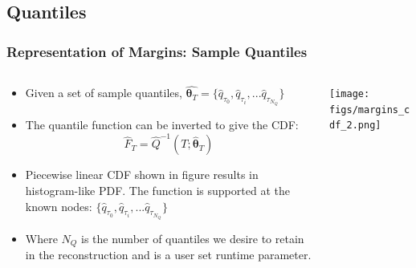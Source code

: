 \documentclass[t, pdftex]{beamer}
\begin{document}
\subsection*{Quantiles}
\begin{frame}
\frametitle{Representation of Margins: Sample Quantiles}
\vspace{-15pt}
    \begin{columns}
        \begin{column}{0.5\textwidth}
            \scriptsize{
                \begin{itemize}
                    \item Given a set of sample quantiles, $\hat{\mathbf{\theta}_T} = \{\hat q_{\tau_0}, \hat q_{\tau_i}, ... \hat{q}_{\tau_{N_Q}} \}$
                    \item The quantile function can be inverted to give the CDF:
                    \[
                    \hat F_T = \hat{Q}^{-1}(T; \mathbf{\hat \theta}_T)
                    \]
                    \item Piecewise linear CDF shown in figure results in histogram-like PDF.  The function is supported at the known nodes: $\{ \hat q_{\tau_0}, \hat q_{\tau_i}, ... \hat q_{\tau_{N_Q}} \}$
                    \item Where $N_{Q}$ is the number of quantiles we desire to retain in the reconstruction and is a user set runtime parameter.
                \end{itemize}
            }
        \end{column}
        \begin{column}{0.5\textwidth}  %
            \begin{center}
                \texttt{[image: figs/margins\_cdf\_2.png]}
            \end{center}
        \end{column}
    \end{columns}
\end{frame}

\end{document}
